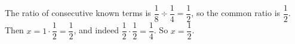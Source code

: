 The ratio of consecutive known terms is \(\dfrac{1}{8}\div\dfrac{1}{4}=\dfrac{1}{2}\), so the common ratio is \(\dfrac{1}{2}\). Then \(x=1\cdot\dfrac{1}{2}=\dfrac{1}{2}\), and indeed \(\dfrac{1}{2}\cdot\dfrac{1}{2}=\dfrac{1}{4}\). So \(x=\boxed{\dfrac{1}{2}}\).

